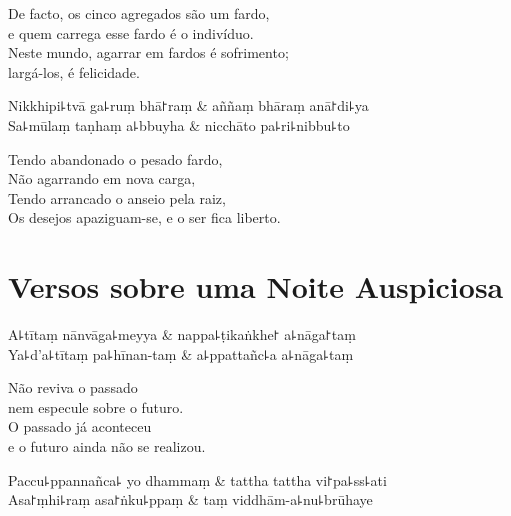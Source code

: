 \begin{english}
  De facto, os cinco agregados são um fardo,\\
  e quem carrega esse fardo é o indivíduo.\\
  Neste mundo, agarrar em fardos é sofrimento;\\
  largá-los, é felicidade.
\end{english}

\begin{twochants}
Nikkhipi꜕tvā ga꜕ruṃ bhā꜓raṃ & aññaṃ bhāraṃ anā꜓di꜕ya \\
Sa꜕mūlaṃ taṇhaṃ a꜕bbuyha & nicchāto pa꜕ri꜕nibbu꜕to \\
\end{twochants}

\begin{english}
  Tendo abandonado o pesado fardo,\\
  Não agarrando em nova carga,\\
  Tendo arrancado o anseio pela raiz,\\
  Os desejos apaziguam-se, e o ser fica liberto.
\end{english}

\chapter{Versos sobre uma Noite Auspiciosa}


\begin{leader}
\end{leader}

\begin{twochants}
  A꜕tītaṃ nānvāga꜕meyya & nappa꜕ṭikaṅkhe꜓ a꜕nāga꜓taṃ \\
  Ya꜕d'a꜕tītaṃ pa꜕hīnan-taṃ & a꜕ppattañc꜕a a꜕nāga꜕taṃ \\
\end{twochants}

\begin{english}
  Não reviva o passado\\
  nem especule sobre o futuro.\\
  O passado já aconteceu\\
  e o futuro ainda não se realizou.
\end{english}

\begin{twochants}
  Paccu꜕ppannañca꜕ yo dhammaṃ & tattha tattha vi꜓pa꜕ss꜕ati \\
  Asa꜓ṃhi꜕raṃ asa꜓ṅku꜕ppaṃ & taṃ viddhām-a꜕nu꜕brūhaye \\
\end{twochants}

